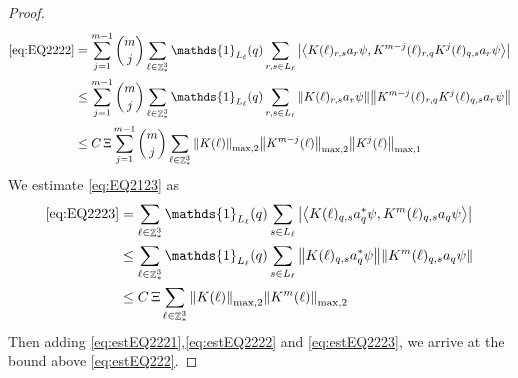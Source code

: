 \documentclass[sn-mathphys, Numbered ,a4paper]{sn-jnl}%
\DeclareMathOperator{\Z}{\mathbb{Z}}
\newcommand{\eva}[1]{\left\langle #1 \right\rangle}
\theoremstyle{plain}
\theoremstyle{definition}
\theoremstyle{remark}
\theoremstyle{plain}
\theoremstyle{definition}
\theoremstyle{remark}
\begin{document}
\begin{proof}
\begin{align}
	\eqref{eq:EQ2222}
	&=\sum\limits_{j=1}^{m-1} {{m}\choose j} \sum\limits_{\ell \in \Z^3_*}\mathds{1}_{L_{\ell}}(q) \sum\limits_{r,s\in L_{\ell}}  \abs{\eva{ K(\ell)_{r,s} a_{r}\psi, K^{m-j}(\ell)_{r,q} K^{j}(\ell)_{q,s} a_{r} \psi }}\nonumber\\
	&\leq \sum\limits_{j=1}^{m-1} {{m}\choose j} \sum\limits_{\ell \in \Z^3_*}\mathds{1}_{L_{\ell}}(q) \sum\limits_{r,s\in L_{\ell}}  \norm{ K(\ell)_{r,s} a_{r}\psi}\norm{ K^{m-j}(\ell)_{r,q} K^{j}(\ell)_{q,s} a_{r} \psi } \nonumber\\
	&\leq C\,\Xi \sum\limits_{j=1}^{m-1} {{m}\choose j} \sum\limits_{\ell \in \Z^3_*} \norm{K(\ell)}_{\mathrm{max,2}} \norm{K^{m-j}(\ell)}_{\mathrm{max,2}} \norm{K^j(\ell)}_{\mathrm{max,1}} \label{eq:estEQ2222}
\end{align}
We estimate \eqref{eq:EQ2123} as 
\begin{align}
	\eqref{eq:EQ2223}
	&=\sum\limits_{\ell \in \Z^3_*} \mathds{1}_{L_{\ell}}(q) \sum\limits_{ s \in L_{\ell}} \abs{\eva{K(\ell)_{q,s} a^*_{q} \psi, K^m(\ell)_{q,s}  a_{q} \psi }} \nonumber\\
	&\leq \sum\limits_{\ell \in \Z^3_*} \mathds{1}_{L_{\ell}}(q) \sum\limits_{ s \in L_{\ell}} \norm{K(\ell)_{q,s} a^*_{q} \psi}\norm{ K^m(\ell)_{q,s}  a_{q} \psi } \nonumber\\
	&\leq C\,\Xi \sum\limits_{\ell \in \Z^3_*} \norm{K(\ell)}_{\mathrm{max,2}} \norm{K^m(\ell)}_{\mathrm{max,2}}  \label{eq:estEQ2223}
\end{align} 
Then adding \eqref{eq:estEQ2221},\eqref{eq:estEQ2222} and \eqref{eq:estEQ2223}, we arrive at the bound above \eqref{eq:estEQ222}. 
\end{proof}
\end{document}
